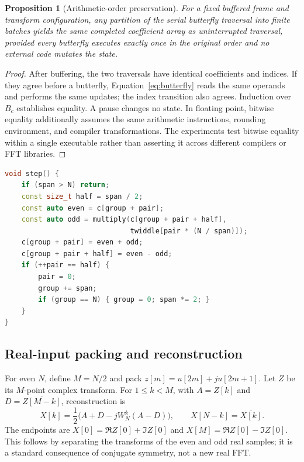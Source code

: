 \documentclass[11pt,letterpaper]{article}
\newtheorem{proposition}{Proposition}
\begin{document}
\begin{proposition}[Arithmetic-order preservation]
For a fixed buffered frame and transform configuration, any partition of the
serial butterfly traversal into finite batches yields the same completed
coefficient array as uninterrupted traversal, provided every butterfly executes
exactly once in the original order and no external code mutates the state.
\end{proposition}
\begin{proof}
After buffering, the two traversals have identical coefficients and indices.
If they agree before a butterfly, Equation~\eqref{eq:butterfly} reads the same
operands and performs the same updates; the index transition also agrees.
Induction over $B_c$ establishes equality. A pause changes no state. In floating
point, bitwise equality additionally assumes the same arithmetic instructions,
rounding environment, and compiler transformations. The experiments test
bitwise equality within a single executable rather than asserting it across
different compilers or FFT libraries.
\end{proof}

\begin{lstlisting}[language=C++,caption={Simplified state transition corresponding to the original complex FFT. Tables and storage are prepared separately.},label={lst:step}]
void step() {
    if (span > N) return;
    const size_t half = span / 2;
    const auto even = c[group + pair];
    const auto odd = multiply(c[group + pair + half],
                              twiddle[pair * (N / span)]);
    c[group + pair] = even + odd;
    c[group + pair + half] = even - odd;
    if (++pair == half) {
        pair = 0;
        group += span;
        if (group == N) { group = 0; span *= 2; }
    }
}
\end{lstlisting}

\subsection{Real-input packing and reconstruction}
For even $N$, define $M=N/2$ and pack
$z[m]=u[2m]+j u[2m+1]$. Let $Z$ be its $M$-point complex transform.
For $1\le k<M$, with
$A=Z[k]$ and $D=\overline{Z[M-k]}$, reconstruction is
\begin{equation}
 X[k]=\frac{1}{2}\bigl(A+D-jW_N^k(A-D)\bigr),\qquad
 X[N-k]=\overline{X[k]}.
 \label{eq:real}
\end{equation}
The endpoints are
$X[0]=\Re Z[0]+\Im Z[0]$ and
$X[M]=\Re Z[0]-\Im Z[0]$.
This follows by separating the transforms of the even and odd real samples;
it is a standard consequence of conjugate symmetry, not a new real FFT.
\end{document}
